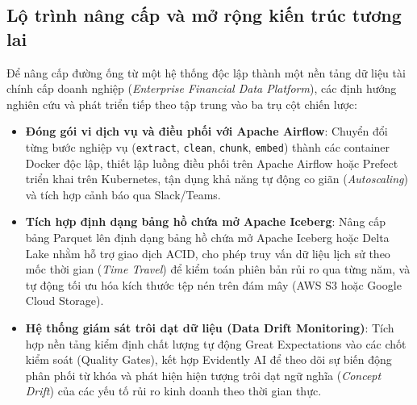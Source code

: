 \subsection{Lộ trình nâng cấp và mở rộng kiến trúc tương lai}
Để nâng cấp đường ống từ một hệ thống độc lập thành một nền tảng dữ liệu tài chính cấp doanh nghiệp (\textit{Enterprise Financial Data Platform}), các định hướng nghiên cứu và phát triển tiếp theo tập trung vào ba trụ cột chiến lược:
\begin{itemize}
    \item \textbf{Đóng gói vi dịch vụ và điều phối với Apache Airflow}: Chuyển đổi từng bước nghiệp vụ (\texttt{extract}, \texttt{clean}, \texttt{chunk}, \texttt{embed}) thành các container Docker độc lập, thiết lập luồng điều phối trên Apache Airflow hoặc Prefect triển khai trên Kubernetes, tận dụng khả năng tự động co giãn (\textit{Autoscaling}) và tích hợp cảnh báo qua Slack/Teams.
    \item \textbf{Tích hợp định dạng bảng hồ chứa mở Apache Iceberg}: Nâng cấp bảng Parquet lên định dạng bảng hồ chứa mở Apache Iceberg hoặc Delta Lake nhằm hỗ trợ giao dịch ACID, cho phép truy vấn dữ liệu lịch sử theo mốc thời gian (\textit{Time Travel}) để kiểm toán phiên bản rủi ro qua từng năm, và tự động tối ưu hóa kích thước tệp nén trên đám mây (AWS S3 hoặc Google Cloud Storage).
    \item \textbf{Hệ thống giám sát trôi dạt dữ liệu (Data Drift Monitoring)}: Tích hợp nền tảng kiểm định chất lượng tự động Great Expectations vào các chốt kiểm soát (Quality Gates), kết hợp Evidently AI để theo dõi sự biến động phân phối từ khóa và phát hiện hiện tượng trôi dạt ngữ nghĩa (\textit{Concept Drift}) của các yếu tố rủi ro kinh doanh theo thời gian thực.
\end{itemize}

